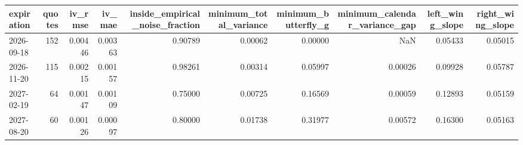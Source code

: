 \begin{tabular}{lrrrrrrrrr}
\toprule
expiration & quotes & iv\_rmse & iv\_mae & inside\_empirical\_noise\_fraction & minimum\_total\_variance & minimum\_butterfly\_g & minimum\_calendar\_variance\_gap & left\_wing\_slope & right\_wing\_slope \\
\midrule
2026-09-18 & 152 & 0.00446 & 0.00363 & 0.90789 & 0.00062 & 0.00000 & NaN & 0.05433 & 0.05015 \\
2026-11-20 & 115 & 0.00215 & 0.00157 & 0.98261 & 0.00314 & 0.05997 & 0.00026 & 0.09928 & 0.05787 \\
2027-02-19 & 64 & 0.00147 & 0.00109 & 0.75000 & 0.00725 & 0.16569 & 0.00059 & 0.12893 & 0.05159 \\
2027-08-20 & 60 & 0.00126 & 0.00097 & 0.80000 & 0.01738 & 0.31977 & 0.00572 & 0.16300 & 0.05163 \\
\bottomrule
\end{tabular}
